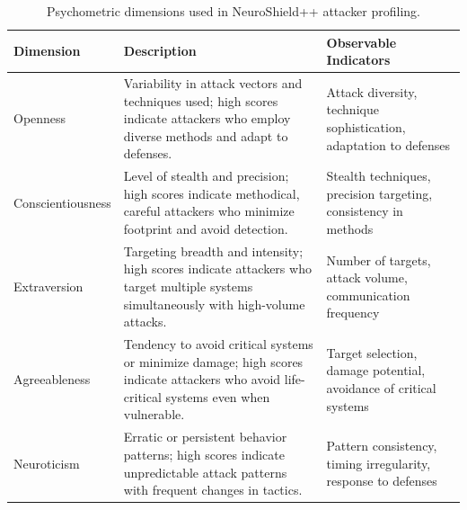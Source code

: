 \begin{table}[t]
\centering
\caption{Psychometric dimensions used in NeuroShield++ attacker profiling.}
\label{tab:psychometric_dimensions}
\begin{tabular}{lp{7cm}p{4cm}}
\hline
\textbf{Dimension} & \textbf{Description} & \textbf{Observable Indicators} \\
\hline
Openness & Variability in attack vectors and techniques used; high scores indicate attackers who employ diverse methods and adapt to defenses. & Attack diversity, technique sophistication, adaptation to defenses \\
\hline
Conscientiousness & Level of stealth and precision; high scores indicate methodical, careful attackers who minimize footprint and avoid detection. & Stealth techniques, precision targeting, consistency in methods \\
\hline
Extraversion & Targeting breadth and intensity; high scores indicate attackers who target multiple systems simultaneously with high-volume attacks. & Number of targets, attack volume, communication frequency \\
\hline
Agreeableness & Tendency to avoid critical systems or minimize damage; high scores indicate attackers who avoid life-critical systems even when vulnerable. & Target selection, damage potential, avoidance of critical systems \\
\hline
Neuroticism & Erratic or persistent behavior patterns; high scores indicate unpredictable attack patterns with frequent changes in tactics. & Pattern consistency, timing irregularity, response to defenses \\
\hline
\end{tabular}
\end{table}